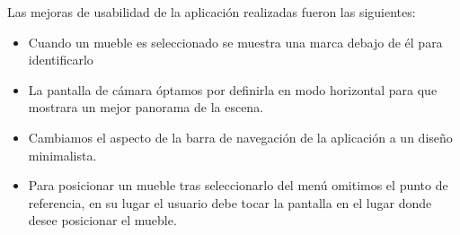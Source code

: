 Las mejoras de usabilidad de la aplicación realizadas fueron las siguientes:
\begin{itemize}
	\item Cuando un mueble es seleccionado se muestra una marca debajo de él para identificarlo
	\item La pantalla de cámara óptamos por definirla en modo horizontal para que mostrara un mejor panorama de la escena.
	\item Cambiamos el aspecto de la barra de navegación de la aplicación a un diseño minimalista.
	\item Para posicionar un mueble tras seleccionarlo del menú omitimos el punto de referencia, en su lugar el usuario debe tocar la pantalla en el lugar donde desee posicionar el mueble.
\end{itemize}
